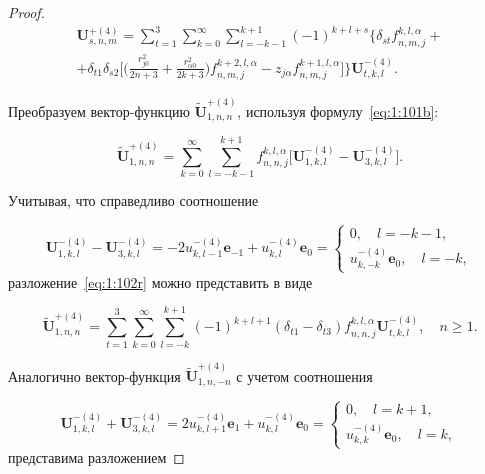 \begin{russian}
\begin{proof}
\begin{multline}\label{eq:1:101b}
\mathbf{U}_{s,n,m}^{+(4)}=\sum\limits_{t=1}^3\sum\limits_{k=0}^\infty\sum\limits_{l=-k-1}^{k+1}(-1)^{k+l+s}\bigg\{\delta_{st}f_{n,m,j}^{k,l,\alpha}+ \\
+\delta_{t1}\delta_{s2}\bigg[\bigg(\frac{r_{j0}^2}{2n+3}+\frac{r_{\alpha 0}^2}{2k+3}\bigg){f}_{n,m,j}^{k+2,l,\alpha}-z_{j\alpha}{f}_{n,m,j}^{k+1,l,\alpha}\bigg]\bigg\}\mathbf{U}_{t,k,l}^{-(4)}.
\end{multline}

Преобразуем вектор-функцию $\mathbf{\tilde U}_{1,n,n}^{+(4)}$, используя формулу~\eqref{eq:1:101b}:

\begin{equation}
\mathbf{\tilde U}_{1,n,n}^{+(4)}=\sum\limits_{k=0}^\infty\sum\limits_{l=-k-1}^{k+1}{f}_{n,n,j}^{k,l,\alpha}\bigg[\mathbf{U}_{1,k,l}^{-(4)}-\mathbf{U}_{3,k,l}^{-(4)}\bigg].
\label{eq:1:102r}
\end{equation}

\noindent Учитывая, что справедливо соотношение

\begin{equation*}
\mathbf{U}_{1,k,l}^{-(4)}-\mathbf{U}_{3,k,l}^{-(4)}=-2u_{k,l-1}^{-(4)}\mathbf{e}_{-1}+
u_{k,l}^{-(4)}\mathbf{e}_0=
\begin{cases}
0,\quad l=-k-1, \\
u_{k,-k}^{-(4)}\mathbf{e}_0,\quad l=-k,
\end{cases}
\end{equation*}
разложение~\eqref{eq:1:102r} можно представить в виде

\begin{equation}
\mathbf{\tilde U}_{1,n,n}^{+(4)}=\sum\limits_{t=1}^3\sum\limits_{k=0}^\infty\sum\limits_{l=-k}^{k+1}(-1)^{k+l+1}(\delta_{t1}-\delta_{t3}){f}_{n,n,j}^{k,l,\alpha}\mathbf{U}_{t,k,l}^{-(4)},\quad n\ge 1.
\label{eq:1:103r}
\end{equation}

Аналогично вектор-функция $\mathbf{\tilde U}_{1,n,-n}^{+(4)}$ с учетом соотношения

\begin{equation*}
\mathbf{U}_{1,k,l}^{-(4)}+\mathbf{U}_{3,k,l}^{-(4)}=2u_{k,l+1}^{-(4)}\mathbf{e}_{1}+
u_{k,l}^{-(4)}\mathbf{e}_0=
\begin{cases}
0,\quad l=k+1, \\
u_{k,k}^{-(4)}\mathbf{e}_0,\quad l=k,
\end{cases}
\end{equation*}
представима разложением


\end{proof}
\end{russian}
